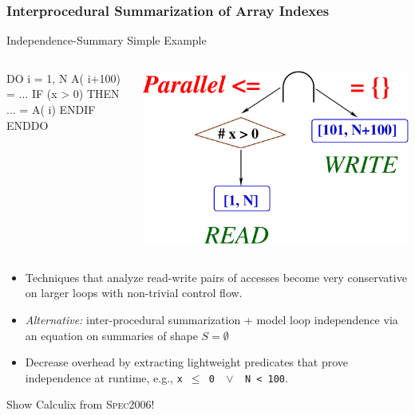 \documentclass{beamer}
\newcommand{\emp}[1]{\textcolor{DikuRed}{ #1}}
\begin{document}
\begin{frame}[fragile,t]
  \frametitle{Interprocedural Summarization of Array Indexes}


\begin{block}{ Independence-Summary Simple Example } \vspace{-1ex}
\begin{columns} 
\begin{colorcode}[fontsize=\scriptsize]
DO i = 1, N
  A(\emp{i+100}) = ...
  IF (x > 0) THEN
    ... = A(\emp{i})
  ENDIF
ENDDO
\end{colorcode}
\begin{center} \hspace{-4ex}
\includegraphics[height=15ex]{ParTeaserFigs/SimpleInd}
\end{center}
\end{columns}
\end{block}


        \begin{itemize}
            \item Techniques that analyze read-write pairs of accesses become
                    very conservative on larger loops with non-trivial control flow.\smallskip   
            \item {\em Alternative:} inter-procedural summarization + model loop independence 
                    via an equation on summaries of shape $S = \emptyset$\\\smallskip 
            \item Decrease overhead by extracting lightweight predicates that prove 
                    independence at runtime, e.g., {\tt x~$\leq$~0~~$\vee$~~N~<~100}.
        \end{itemize} 

\bigskip

\alert{Show Calculix from \textsc{Spec2006}}!

\end{frame}
\end{document}
